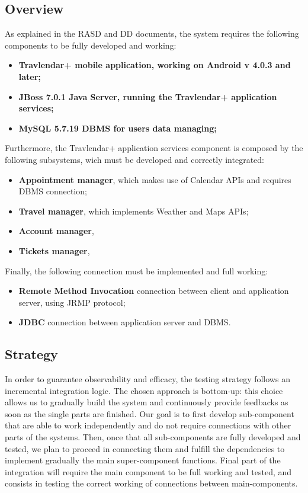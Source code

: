 \subsection{Overview}

As explained in the RASD and DD documents, the system requires the following components to be fully developed and working:
\begin{itemize}
	\item \textbf{Travlendar+ mobile application, working on Android v 4.0.3 and later;}
	\item \textbf{JBoss 7.0.1 Java Server, running the Travlendar+ application services;}
	\item \textbf{MySQL 5.7.19 DBMS for users data managing;}
\end{itemize}
Furthermore, the Travlendar+ application services component is composed by the following subsystems, wich must be developed and correctly integrated:
\begin{itemize}
	\item \textbf{Appointment manager}, which makes use of Calendar APIs and requires DBMS connection;
	\item \textbf{Travel manager}, which implements Weather and Maps APIs;
	\item \textbf{Account manager},
	\item \textbf{Tickets manager},
\end{itemize}
Finally, the following connection must be implemented and full working:
\begin{itemize}
	\item \textbf{Remote Method Invocation} connection between client and application server, using JRMP protocol;
	\item \textbf{JDBC} connection between application server and DBMS.
\end{itemize}

\subsection{Strategy}
In order to guarantee observability and efficacy, the testing strategy follows an incremental integration logic. The chosen approach is bottom-up: this choice allows us to gradually build the system and continuously provide feedbacks as soon as the single parts are finished. Our goal is to first develop sub-component that are able to work independently and do not require connections with other parts of the systems. Then, once that all sub-components are fully developed and tested, we plan to proceed in connecting them and fulfill the dependencies to implement gradually the main super-component functions. Final part of the integration will require the main component to be full working and tested, and consists in testing the correct working of connections between main-components. 

